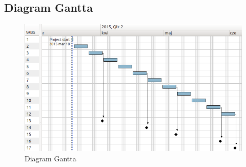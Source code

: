 \documentclass[a4paper]{article}
\begin{document}
\subsection{Diagram Gantta}
\begin{figure}[h] %
  \begin{center}  
    \includegraphics[width=\textwidth]{./rysunki/gantt.png} 
  \end{center}
  \caption{Diagram Gantta}
  \label{fig:gantt} 
\end{figure}       
\end{document}
